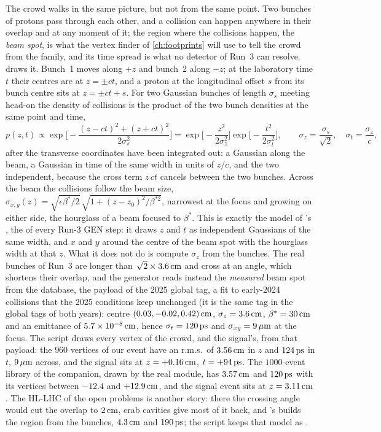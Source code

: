 The crowd walks in the same picture, but not from the same point. Two
bunches of protons pass through each other, and a collision can happen
anywhere in their overlap and at any moment of it; the region where the
collisions happen, the \emph{beam spot}, is what the vertex finder of
\cref{ch:footprints} will use to tell the crowd from the family, and
its time spread is what no detector of Run~3 can resolve.
 draws it. Bunch~1 moves along
$+z$ and bunch~2 along $-z$; at the laboratory time $t$ their centres are
at $z=\pm ct$, and a proton at the longitudinal offset $s$ from its bunch
centre sits at $z=\pm ct+s$. For two Gaussian bunches of length
$\sigma_s$ meeting head-on the density of collisions is the product of
the two bunch densities at the same point and time,
\begin{equation}
  p(z,t)\propto
  \exp\!\Big[-\frac{(z-ct)^2+(z+ct)^2}{2\sigma_s^2}\Big]
  =\exp\!\Big[-\frac{z^2}{2\sigma_z^2}\Big]\exp\!\Big[-\frac{t^2}{2\sigma_t^2}\Big],
  \qquad \sigma_z=\frac{\sigma_s}{\sqrt2},\quad \sigma_t=\frac{\sigma_z}{c},
  \label{eq:crowd_on_the_road:region}
\end{equation}
after the transverse coordinates have been integrated out: a Gaussian
along the beam, a Gaussian in time of the same width in units of $z/c$,
and the two independent, because the cross term $z\,ct$ cancels between
the two bunches. Across the beam the collisions follow the beam size,
$\sigma_{x,y}(z)=\sqrt{\epsilon\beta^*/2}\,\sqrt{1+(z-z_0)^2/\beta^{*2}}$,
narrowest at the focus and growing on either side, the hourglass of a
beam focused to $\beta^*$. This is exactly the model of \CMSSW's
, the  of every Run-3
GEN step: it draws $z$ and $t$ as independent Gaussians of the same
width, and $x$ and $y$ around the centre of the beam spot with the
hourglass width at that $z$. What it does not do is compute $\sigma_z$
from the bunches. The real bunches of Run~3 are longer than
$\sqrt2\times3.6\,\mathrm{cm}$ and cross at an angle, which shortens their overlap,
and the generator reads instead the \emph{measured} beam spot from the
database, the  payload of the 2025 global tag, a fit
to early-2024 collisions that the 2025 conditions keep unchanged (it is
the same tag in the global tags of both years): centre $(0.03,-0.02,0.42)\,\mathrm{cm}$, $\sigma_z=3.6\,\mathrm{cm}$,
$\beta^*=30\,\mathrm{cm}$ and an emittance of $5.7\times10^{-8}\,\mathrm{cm}$, hence
$\sigma_t=120\,\mathrm{ps}$ and $\sigma_{xy}=9\,\mu\mathrm{m}$ at the focus. The script draws
every vertex of the crowd, and the signal's, from that payload: the $960$
vertices of our event have an r.m.s.\ of $3.56\,\mathrm{cm}$ in $z$ and $124\,\mathrm{ps}$
in $t$, $9\,\mu\mathrm{m}$ across, and the signal sits at $z=+0.16\,\mathrm{cm}$, $t=+94\,\mathrm{ps}$.
The $1000$-event \CMSSW library of the companion, drawn by the real
module, has $3.57\,\mathrm{cm}$ and $120\,\mathrm{ps}$ with its vertices between $-12.4$ and
$+12.9\,\mathrm{cm}$, and the \CMSSW signal event sits at $z=3.11\,\mathrm{cm}$. The HL-LHC
of the open problems is another story: there the crossing angle would
cut the overlap to $2\,\mathrm{cm}$, crab cavities give most of it back, and
\CMSSW's  builds the region from the bunches,
$4.3\,\mathrm{cm}$ and $190\,\mathrm{ps}$; the script keeps that model as .

